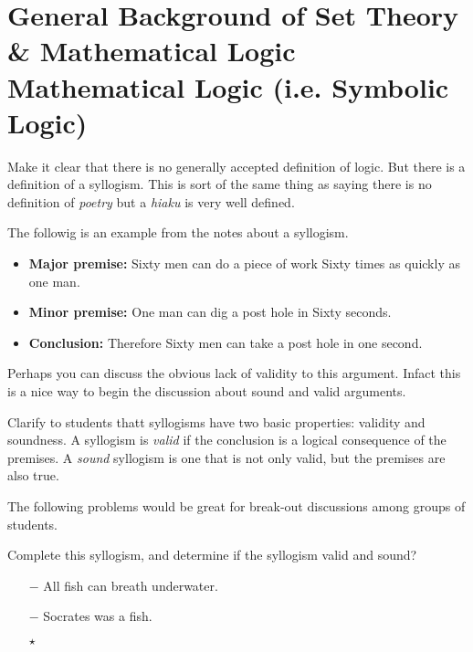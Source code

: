 \section{General Background of Set Theory \& Mathematical Logic\\Mathematical Logic (i.e. Symbolic Logic)}

Make it clear that there is no generally accepted definition of logic.  But there is a definition of a syllogism.  This is sort of the same thing as saying there is no definition of \emph{poetry} but a \emph{hiaku} is very well defined.


\ifKey
\color{red}
The followig is an example from the notes about a syllogism.  
\begin{itemize}
\item {\bf Major premise:} Sixty men can do a piece of work Sixty times as quickly as one man.
\item {\bf Minor premise:} One man can dig a post hole in Sixty seconds.
\item {\bf Conclusion:} Therefore Sixty men can take a post hole in one second.
\end{itemize}

Perhaps you can discuss the obvious lack of validity to this argument.  Infact this is a nice way to begin the discussion about sound and valid arguments.  

\color{black}
\else
{}
\fi

\ifKey
\color{red}
Clarify to students thatt syllogisms have two basic properties: validity and soundness. A syllogism is \emph{valid} if the conclusion is a logical consequence of the premises.  A \emph{sound} syllogism is one that is not only valid, but the premises are also true.
\color{black}
\else
{}
\fi



The following problems would be great for break-out discussions among groups of students.  
\begin{problem} Complete this syllogism, and determine if the syllogism valid and sound?

\ifKey
\color{red}
\begin{enumerate}
\item [$-$]All fish can breath underwater.
\item [$-$]Socrates was a fish.
\item [$\star$]
\end{enumerate}
\vspace{1em}
\color{black}
\else
{}
\fi

\end{problem}

